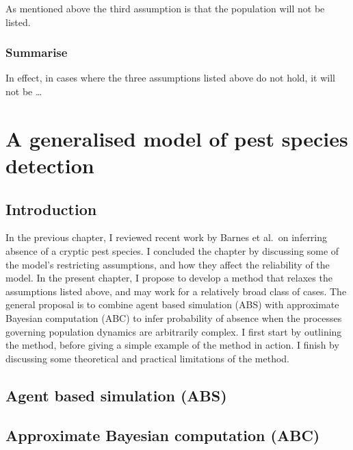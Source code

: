 \documentclass[
]{book}
\begin{document}
As mentioned above the third assumption is that the population will not be listed.

\hypertarget{summarise}{%
\subsection{Summarise}\label{summarise}}

In effect, in cases where the three assumptions listed above do not hold, it will not be \ldots{}

\hypertarget{a-generalised-model-of-pest-species-detection}{%
\chapter{A generalised model of pest species detection}\label{a-generalised-model-of-pest-species-detection}}

\hypertarget{introduction-1}{%
\section{Introduction}\label{introduction-1}}

In the previous chapter, I reviewed recent work by Barnes et al.~on inferring absence of a cryptic pest species. I concluded the chapter by discussing some of the model's restricting assumptions, and how they affect the reliability of the model. In the present chapter, I propose to develop a method that relaxes the assumptions listed above, and may work for a relatively broad class of cases. The general proposal is to combine agent based simulation (ABS) with approximate Bayesian computation (ABC) to infer probability of absence when the processes governing population dynamics are arbitrarily complex. I first start by outlining the method, before giving a simple example of the method in action. I finish by discussing some theoretical and practical limitations of the method.

\hypertarget{agent-based-simulation-abs}{%
\section{Agent based simulation (ABS)}\label{agent-based-simulation-abs}}

\hypertarget{approximate-bayesian-computation-abc}{%
\section{Approximate Bayesian computation (ABC)}\label{approximate-bayesian-computation-abc}}
\end{document}
